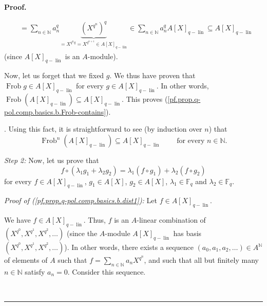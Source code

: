 \documentclass[numbers=enddot,12pt,final,onecolumn,notitlepage]{scrartcl}%
\theoremstyle{definition}
\newenvironment{proof}[1][Proof]{\noindent\textbf{#1.} }{\ \rule{0.5em}{0.5em}}
\let\sumnonlimits\sum
\renewcommand{\sum}{\sumnonlimits\limits}
\begin{document}
\begin{proof}
{\begin{align*}
&  =\sum_{n\in\mathbb{N}}a_{n}^{q}\underbrace{\left(  X^{q^{n}}\right)  ^{q}%
}_{=X^{q^{n}q}=X^{q^{n+1}}\in A\left[  X\right]  _{q-\operatorname*{lin}}}%
\in\sum_{n\in\mathbb{N}}a_{n}^{q}A\left[  X\right]  _{q-\operatorname*{lin}%
}\subseteq A\left[  X\right]  _{q-\operatorname*{lin}}%
\end{align*}
(since $A\left[  X\right]  _{q-\operatorname*{lin}}$ is an $A$-module).
\par
Now, let us forget that we fixed $g$. We thus have proven that
$\operatorname*{Frob}g\in A\left[  X\right]  _{q-\operatorname*{lin}}$ for
every $g\in A\left[  X\right]  _{q-\operatorname*{lin}}$. In other words,
$\operatorname*{Frob}\left(  A\left[  X\right]  _{q-\operatorname*{lin}%
}\right)  \subseteq A\left[  X\right]  _{q-\operatorname*{lin}}$. This proves
(\ref{pf.prop.q-pol.comp.basics.b.Frob-contains}).}. Using this fact, it is
straightforward to see (by induction over $n$) that%
\begin{equation}
\operatorname*{Frob}\nolimits^{n}\left(  A\left[  X\right]
_{q-\operatorname*{lin}}\right)  \subseteq A\left[  X\right]
_{q-\operatorname*{lin}}\ \ \ \ \ \ \ \ \ \ \text{for every }n\in\mathbb{N}.
\label{pf.prop.q-pol.comp.basics.b.Frob-contains-n}%
\end{equation}


\textit{Step 2:} Now, let us prove that%
\begin{equation}
f\circ\left(  \lambda_{1}g_{1}+\lambda_{2}g_{2}\right)  =\lambda_{1}\left(
f\circ g_{1}\right)  +\lambda_{2}\left(  f\circ g_{2}\right)
\label{pf.prop.q-pol.comp.basics.b.dist1}%
\end{equation}
for every $f\in A\left[  X\right]  _{q-\operatorname*{lin}}$, $g_{1}\in
A\left[  X\right]  $, $g_{2}\in A\left[  X\right]  $, $\lambda_{1}%
\in\mathbb{F}_{q}$ and $\lambda_{2}\in\mathbb{F}_{q}$.

\textit{Proof of (\ref{pf.prop.q-pol.comp.basics.b.dist1}):} Let $f\in
A\left[  X\right]  _{q-\operatorname*{lin}}$.

We have $f\in A\left[  X\right]  _{q-\operatorname*{lin}}$. Thus, $f$ is an
$A$-linear combination of $\left(  X^{q^{0}},X^{q^{1}},X^{q^{2}}%
,\ldots\right)  $ (since the $A$-module $A\left[  X\right]
_{q-\operatorname*{lin}}$ has basis $\left(  X^{q^{0}},X^{q^{1}},X^{q^{2}%
},\ldots\right)  $). In other words, there exists a sequence $\left(
a_{0},a_{1},a_{2},\ldots\right)  \in A^{\mathbb{N}}$ of elements of $A$ such
that $f=\sum_{n\in\mathbb{N}}a_{n}X^{q^{n}}$, and such that all but finitely
many $n\in\mathbb{N}$ satisfy $a_{n}=0$. Consider this sequence.


\end{proof}
\end{document}
